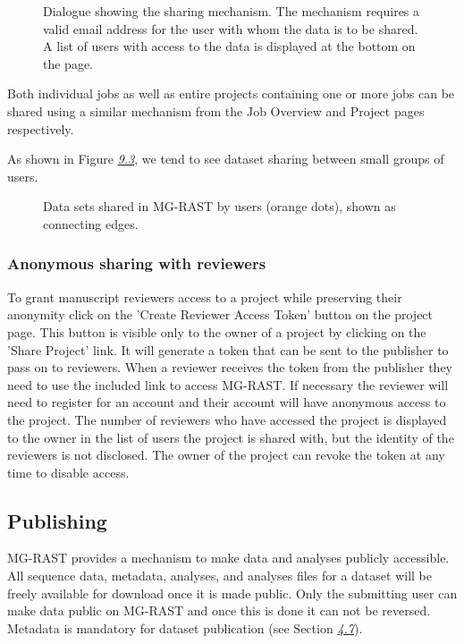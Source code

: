 \documentclass[letterpaper,10pt,english]{sphinxmanual}
\begin{document}
\begin{figure}[htbp]
\centering
\capstart

\noindent{}
\caption{Dialogue showing the sharing mechanism. The mechanism requires a
valid email address for the user with whom the data is to be shared.
A list of users with access to the data is displayed at the bottom on
the page.}\label{\detokenize{faq:fig-sharing}}\end{figure}

Both individual jobs as well as entire projects containing one or more
jobs can be shared using a similar mechanism from the Job Overview and
Project pages respectively.

As shown in Figure {\hyperref[\detokenize{faq:fig:Data-sharing-in-mg-rast}]{\emph{9.3}}}, we tend to
see dataset sharing between small groups of users.

\begin{figure}[htbp]
\centering
\capstart

\noindent{}
\caption{Data sets shared in MG-RAST by users (orange dots), shown as
connecting edges.}\label{\detokenize{faq:fig-data-sharing-in-mg-rast}}\end{figure}


\subsubsection{Anonymous sharing with reviewers}
\label{\detokenize{faq:anonymous-sharing-with-reviewers}}\label{\detokenize{faq:section-reviewer-sharing}}
To grant manuscript reviewers access to a project while preserving their
anonymity click on the ’Create Reviewer Access Token’ button on the
project page. This button is visible only to the owner of a project by
clicking on the ’Share Project’ link. It will generate a token that can
be sent to the publisher to pass on to reviewers. When a reviewer
receives the token from the publisher they need to use the included link
to access MG-RAST. If necessary the reviewer will need to register for
an account and their account will have anonymous access to the project.
The number of reviewers who have accessed the project is displayed to
the owner in the list of users the project is shared with, but the
identity of the reviewers is not disclosed. The owner of the project can
revoke the token at any time to disable access.


\subsection{Publishing}
\label{\detokenize{faq:publishing}}\label{\detokenize{faq:section-publishing}}
MG-RAST provides a mechanism to make data and analyses publicly
accessible. All sequence data, metadata, analyses, and analyses files
for a dataset will be freely available for download once it is made
public. Only the submitting user can make data public on MG-RAST and
once this is done it can not be reversed. Metadata is mandatory for
dataset publication (see Section {\hyperref[\detokenize{faq:section:metadata}]{\emph{4.7}}}).
\end{document}
